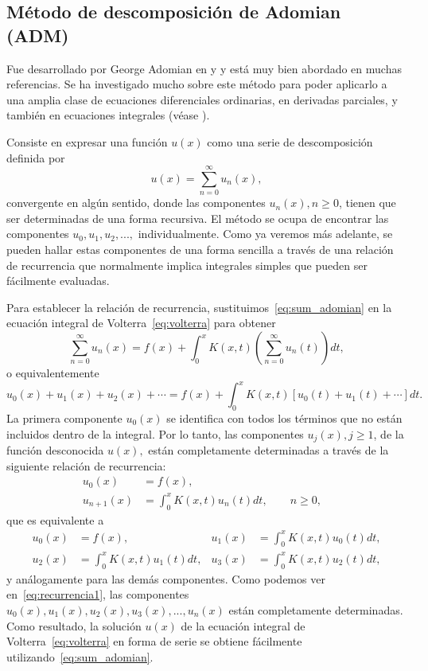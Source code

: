 \subsection{Método de descomposición de Adomian (ADM)}
Fue desarrollado por George Adomian en \cite{Adomian1} y \cite{Adomian12} y está muy bien abordado en muchas referencias. Se ha investigado mucho sobre este método para poder aplicarlo a una amplia clase de ecuaciones diferenciales ordinarias, en derivadas parciales, y también en ecuaciones integrales (véase \cite{Atkinson}).

Consiste en expresar una función $u(x)$ como una serie de descomposición definida por
\begin{equation}\label{eq:sum_adomian}
	u(x) = \sum_{n=0}^{\infty} u_n(x),
\end{equation} 
convergente en algún sentido, donde las componentes $u_n(x), n \geqslant 0$, tienen que ser determinadas de una forma recursiva. El método se ocupa de encontrar las componentes $u_0, u_1, u_2, ...,$ individualmente. Como ya veremos más adelante, se pueden hallar estas componentes de una forma sencilla a través de una relación de recurrencia que normalmente implica integrales simples que pueden ser fácilmente evaluadas.

Para establecer la relación de recurrencia, sustituimos~\eqref{eq:sum_adomian} en la ecuación integral de Volterra~\eqref{eq:volterra} para obtener 
\begin{equation}
	\sum_{n=0}^{\infty} u_n(x) = f(x) + \int_{0}^{x} K(x,t)(\sum_{n=0}^{\infty} u_n(t))dt,
\end{equation}
o equivalentemente
\begin{equation}
	u_0(x) + u_1(x) + u_2(x) + \cdots = f(x) + \int_{0}^{x} K(x,t)[u_0(t) + u_1(t) + \cdots]dt.
\end{equation}
La primera componente $u_0(x)$ se identifica con todos los términos que no están incluidos dentro de la integral. Por lo tanto, las componentes $u_j(x), j \geqslant 1$, de la función desconocida $u(x),$ están completamente determinadas a través de la siguiente relación de recurrencia:
\begin{align}
	u_0(x) &= f(x),      &   \\
	u_{n+1}(x) &=  \int_{0}^{x} K(x,t)u_n(t)dt, \qquad n \geqslant 0,         & 
\end{align}
que es equivalente a 
\begin{align}\label{eq:recurrencia1}
	u_0(x)&=f(x),          &  u_1(x) &= \int_{0}^{x} K(x,t)u_0(t)dt,      \\
	u_2(x)&= \int_{0}^{x} K(x,t)u_1(t)dt,   &  u_3(x)&= \int_{0}^{x} K(x,t)u_2(t)dt, 
\end{align}
y análogamente para las demás componentes. Como podemos ver en~\eqref{eq:recurrencia1}, las componentes $u_0(x), u_1(x), u_2(x), u_3(x),..., u_n(x)$ están completamente determinadas. Como resultado, la solución $u(x)$ de la ecuación integral de Volterra~\eqref{eq:volterra} en forma de serie se obtiene fácilmente utilizando~\eqref{eq:sum_adomian}.


